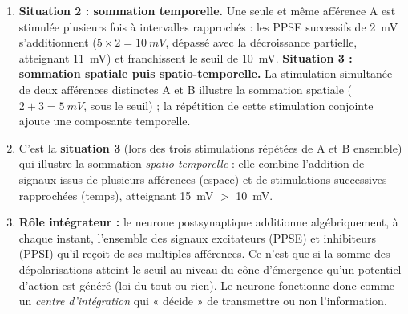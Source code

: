 \documentclass[11pt]{article}
\begin{document}
\begin{corrige}
\begin{enumerate}
\item \textbf{Situation 2 : sommation temporelle.} Une seule et même afférence A est stimulée plusieurs fois à intervalles rapprochés : les PPSE successifs de \SI{2}{mV} s'additionnent ($5 \times 2 = \SI{10}{mV}$, dépassé avec la décroissance partielle, atteignant \SI{11}{mV}) et franchissent le seuil de \SI{10}{mV}.
\textbf{Situation 3 : sommation spatiale puis spatio-temporelle.} La stimulation simultanée de deux afférences distinctes A et B illustre la sommation spatiale ($2 + 3 = \SI{5}{mV}$, sous le seuil) ; la répétition de cette stimulation conjointe ajoute une composante temporelle.
\item C'est la \textbf{situation 3} (lors des trois stimulations répétées de A et B ensemble) qui illustre la sommation \emph{spatio-temporelle} : elle combine l'addition de signaux issus de plusieurs afférences (espace) et de stimulations successives rapprochées (temps), atteignant \SI{15}{mV} $>$ \SI{10}{mV}.
\item \textbf{Rôle intégrateur :} le neurone postsynaptique additionne algébriquement, à chaque instant, l'ensemble des signaux excitateurs (PPSE) et inhibiteurs (PPSI) qu'il reçoit de ses multiples afférences. Ce n'est que si la somme des dépolarisations atteint le seuil au niveau du cône d'émergence qu'un potentiel d'action est généré (loi du tout ou rien). Le neurone fonctionne donc comme un \emph{centre d'intégration} qui « décide » de transmettre ou non l'information.
\end{enumerate}
\end{corrige}
\end{document}
